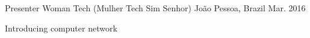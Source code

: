 

\begin{cventries}

  \cventry
    {Presenter} %
    {Woman Tech (Mulher Tech Sim Senhor)} %
    {João Pessoa, Brazil} %
    {Mar. 2016} %
    {
      \begin{cvitems} %
        \item {Introducing computer network}
      \end{cvitems}
    }

\end{cventries}
